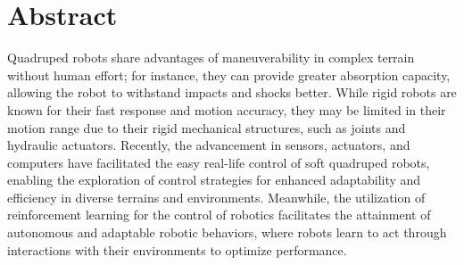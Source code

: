 

%     

\newpage
{}
\chapter*{Abstract}

Quadruped robots share advantages of maneuverability in complex terrain without human effort; for instance, they can provide greater absorption capacity, allowing the robot to withstand impacts and shocks better. While rigid robots are known for their fast response and motion accuracy, they may be limited in their motion range due to their rigid mechanical structures, such as joints and hydraulic actuators. Recently, the advancement in sensors, actuators, and computers have facilitated the easy real-life control of soft quadruped robots, enabling the exploration of control strategies for enhanced adaptability and efficiency in diverse terrains and environments. Meanwhile, the utilization of reinforcement learning for the control of robotics facilitates the attainment of autonomous and adaptable robotic behaviors, where robots learn to act through interactions with their environments to optimize performance. 

